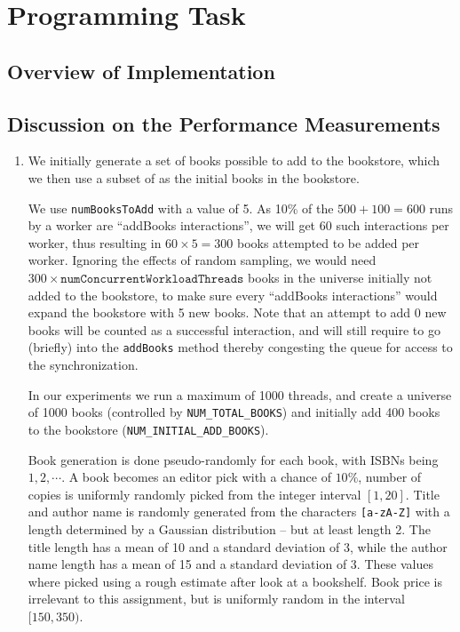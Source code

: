 \documentclass[11pt,a4paper,english]{article}
\begin{document}
\begin{enumerate}
\end{enumerate}

\section*{Programming Task}
\subsection*{Overview of Implementation}
\subsection*{Discussion on the Performance Measurements}
\begin{enumerate}
\item We initially generate a set of books possible to add to the bookstore,
  which we then use a subset of as the initial books in the bookstore.

  We use \verb|numBooksToAdd| with a value of 5. As 10\% of the $500+100 = 600$
  runs by a worker are ``addBooks interactions'', we will get $60$ such
  interactions per worker, thus resulting in $60 \times 5 = 300$ books attempted
  to be added per worker. Ignoring the effects of random sampling, we would need
  $300 \times \mathtt{numConcurrentWorkloadThreads}$ books in the universe
  initially not added to the bookstore, to make sure every ``addBooks
  interactions'' would expand the bookstore with 5 new books. Note that an
  attempt to add 0 new books will be counted as a successful interaction, and
  will still require to go (briefly) into the \verb|addBooks| method thereby
  congesting the queue for access to the synchronization.

  In our experiments we run a maximum of 1000 threads, and create a
  universe of 1000 books (controlled by \verb|NUM_TOTAL_BOOKS|) and initially
  add 400 books to the bookstore (\verb|NUM_INITIAL_ADD_BOOKS|).

  Book generation is done pseudo-randomly for each book, with ISBNs being
  $1,2,\cdots$. A book becomes an editor pick with a chance of $10\%$, number of
  copies is uniformly randomly picked from the integer interval $[1,20]$. Title
  and author name is randomly generated from the characters \verb|[a-zA-Z]| with
  a length determined by a Gaussian distribution -- but at least length 2. The
  title length has a mean of 10 and a standard deviation of 3, while the author
  name length has a mean of 15 and a standard deviation of 3. These values where
  picked using a rough estimate after look at a bookshelf. Book price is
  irrelevant to this assignment, but is uniformly random in the interval
  $[150,350)$.


\end{enumerate}
\end{document}
